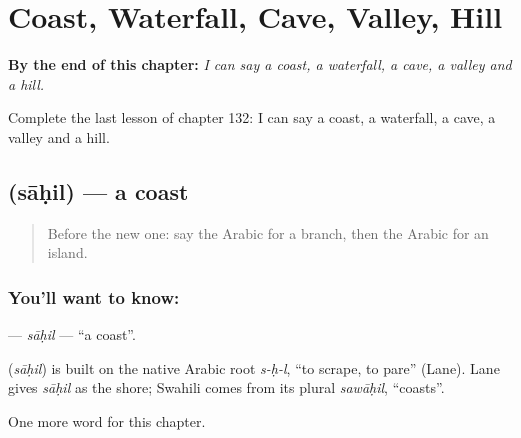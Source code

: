 
\chapter{Coast, Waterfall, Cave, Valley, Hill}
\label{ch:ar-coast-waterfall-cave-valley-hill}

\begin{chapteropening}
\textbf{By the end of this chapter:} \emph{I can say a coast, a waterfall, a cave, a valley and a hill.}

Complete the last lesson of chapter 132: I can say a coast, a waterfall, a cave, a valley and a hill.
\end{chapteropening}

\section[\texorpdfstring{\ar{ساحل} (sāḥil)}{ساحل (sāḥil)}]{ (sāḥil) — a coast}

\label{lesson:AR-C132-sahil}



\begin{quote}
Before the new one: say the Arabic for a branch, then the Arabic for an island.
\end{quote}

\subsection*{You'll want to know: }
\textbf{} — \emph{sāḥil} — \textquotedblleft{}a coast\textquotedblright{}.

\begin{cousinweb}
\textbf{} (\emph{sāḥil}) is built on the native Arabic root \emph{s-ḥ-l}, \textquotedblleft{}to scrape, to pare\textquotedblright{} (Lane). Lane gives \emph{sāḥil} as the shore; Swahili comes from its plural \emph{sawāḥil}, \textquotedblleft{}coasts\textquotedblright{}.
\end{cousinweb}

\begin{grammarlens}[title={What you've built}]
One more word for this chapter.
\end{grammarlens}

